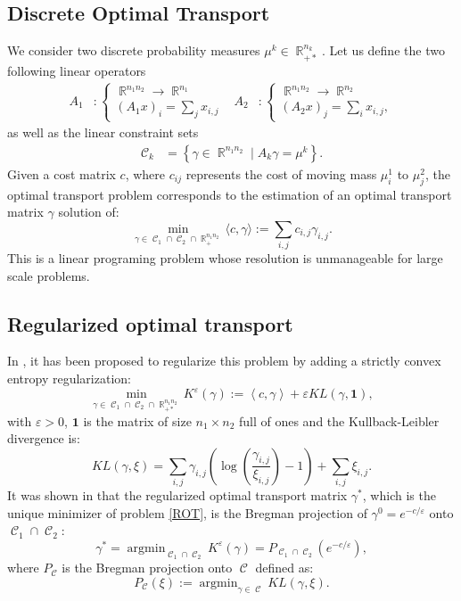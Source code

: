 \documentclass{article} %
\newcommand{\scal}[2]{\left\langle #1 , #2 \right\rangle}
\DeclareMathOperator{\IR}{\mathbb{R}}
\DeclareMathOperator*{\argmin}{argmin}
\DeclareMathOperator{\Ccal}{\mathcal{C}}
\renewcommand{\epsilon}{\varepsilon}
\theoremstyle{plain}
\theoremstyle{definition}
\theoremstyle{remark}
\begin{document}
\subsection{Discrete Optimal Transport}
We consider two discrete probability measures $\mu^k \in \IR_{+*}^{n_k}$.
Let us define the two following linear operators
\begin{align*}
A_1 &: \begin{cases}
\IR^{n_1 n_2} \rightarrow \IR^{n_1} \\
(A_1 x)_i = \sum_j x_{i,j}
\end{cases} &
A_2 &: \begin{cases}
\IR^{n_1 n_2} \rightarrow \IR^{n_2}\\
(A_2 x)_j = \sum_i x_{i,j},
\end{cases}
\end{align*}
as well as the linear  constraint sets
\begin{align*}
\Ccal_k &= \left\{ \gamma\in\IR^{n_1 n_2} \mid A_k \gamma = \mu^k \right\}.
\end{align*}
Given a cost matrix $c$, where $c_{ij}$ represents the cost of moving mass $\mu^1_i$ to $\mu^2_j$,  the optimal transport problem corresponds to the estimation of an optimal transport matrix $\gamma$ solution of:
$$\min_{\gamma\in\Ccal_1\cap \Ccal_2\cap \IR^{n_1 n_2}_+} \langle c,\gamma\rangle:=\sum_{i,j}c_{i,j}\gamma_{i,j}.$$
This is a linear programing problem whose resolution is unmanageable for large scale problems. 

\subsection{Regularized optimal transport}

In \cite{cuturi13}, it has been proposed to regularize this problem by adding a strictly convex entropy regularization:
\begin{equation}\label{ROT}
\min_{\gamma\in\Ccal_1\cap \Ccal_2\cap \IR^{n_1 n_2}_{+*}}K^\epsilon(\gamma) := \scal{c}{\gamma} 
+ \epsilon KL(\gamma,\mathbf{1})
,\end{equation}
with $\epsilon>0$, $\mathbf{1}$ is the matrix of size $n_1\times n_2$ full of ones and the Kullback-Leibler divergence is:
\begin{equation}\label{KL}
KL(\gamma,\xi) = \sum_{i,j} \gamma_{i,j} \left( \log \left( \frac{\gamma_{i,j}}{\xi_{i,j}} \right) -1  \right) + \sum_{i,j} \xi_{i,j}.
\end{equation}
It was shown in \cite{benamou15}  that the regularized optimal transport matrix $\gamma^*$, which is the unique minimizer of problem \eqref{ROT},  is the Bregman projection of $\gamma^0 = e^{-c/\epsilon}$ onto $\Ccal_1 \cap \Ccal_2$:
\begin{equation}\label{eq:reg_ot_pb}
\gamma^* = \argmin_{\Ccal_1 \cap \Ccal_2} K^\epsilon(\gamma)= P_{\Ccal_1 \cap \Ccal_2} (e^{-c/\epsilon}),
\end{equation}
where $P_{\Ccal}$ is the  Bregman projection onto $\Ccal$ defined as:
\[
P_{\Ccal}(\xi) := \argmin_{\gamma \in \Ccal} KL(\gamma,\xi).
\]
\end{document}
